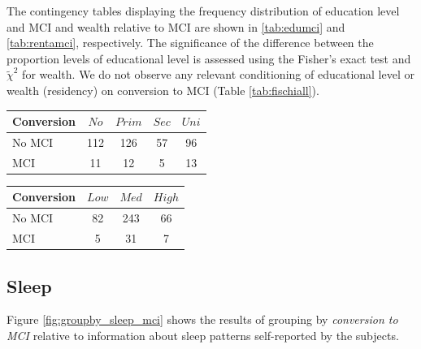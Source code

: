 \documentclass[11pt]{article}
\theoremstyle{definition}
\theoremstyle{remark}
\begin{document}
The contingency tables displaying the frequency distribution of education level and MCI and wealth relative to MCI are shown in \ref{tab:edumci} and \ref{tab:rentamci}, respectively. The significance of the difference between the proportion levels of educational level is assessed using the Fisher's exact test and $\tilde{\chi}^2$ for wealth.
We do not observe any relevant conditioning of educational level or wealth (residency) on conversion to MCI (Table \ref{tab:fischiall}).

\begin{minipage}[b]{.40\textwidth}
   \centering
    \begin{tabular}[t]{lcccc}
    \hline
    Conversion&{$No$}&{$Prim$}&{$Sec$}&{$Uni$} \\
    \hline
    No MCI&112&126&57&96\\
    MCI&11&12&5&13\\
    \hline
  \end{tabular}
   \label{tab:edumci}
\end{minipage}\qquad
\begin{minipage}[b]{.40\textwidth}
   \centering
    \begin{tabular}[t]{lccc}
    \hline
    Conversion&{$Low$}&{$Med$}&{$High$} \\
    \hline
    No MCI&82&243&66\\
    MCI&5&31&7\\
    \hline
  \end{tabular}
   \label{tab:rentamci}
\end{minipage}

\subsection{Sleep}
Figure \ref{fig:groupby_sleep_mci} shows the results of grouping by \emph{conversion to MCI} relative to information about sleep patterns self-reported by the subjects. 
\end{document}
